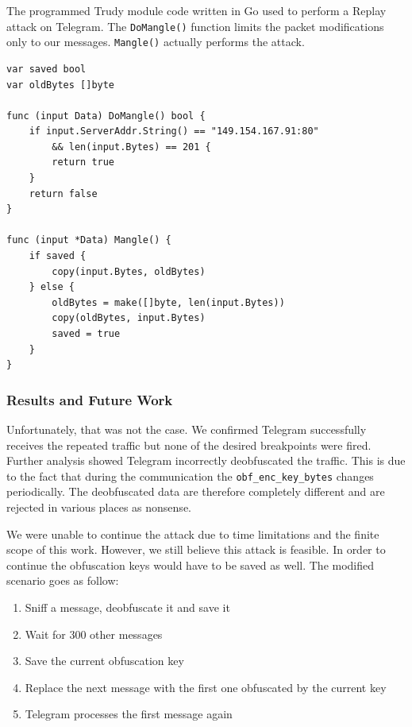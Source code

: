 \documentclass[thesis=M,english]{FITthesis}[2012/10/20]
\begin{document}
\begin{listing}[htb]
\caption{The programmed Trudy module code written in Go used to perform a Replay attack on Telegram. The \texttt{DoMangle()} function limits the packet modifications only to our messages. \texttt{Mangle()} actually performs the attack.}
\label{lst:analysis-replay-module}
\begin{verbatim}
var saved bool
var oldBytes []byte

func (input Data) DoMangle() bool {
	if input.ServerAddr.String() == "149.154.167.91:80"
		&& len(input.Bytes) == 201 {
		return true
	}
	return false
}

func (input *Data) Mangle() {
	if saved {
		copy(input.Bytes, oldBytes)
	} else {
		oldBytes = make([]byte, len(input.Bytes))
		copy(oldBytes, input.Bytes)
		saved = true
	}
}
\end{verbatim}
\end{listing}


\subsubsection{Results and Future Work}

Unfortunately, that was not the case. We confirmed Telegram successfully  receives the repeated traffic but none of the desired breakpoints were fired. Further analysis showed Telegram incorrectly deobfuscated the traffic. This is due to the fact that during the communication the \texttt{obf\_enc\_key\_bytes} changes periodically. The deobfuscated data are therefore completely different and are rejected in various places as nonsense.

We were unable to continue the attack due to time limitations and the finite scope of this work. However, we still believe this attack is feasible. In order to continue the obfuscation keys would have to be saved as well. The modified scenario goes as follow:

\begin{enumerate}
	\item Sniff a message, deobfuscate it and save it
	\item Wait for 300 other messages
	\item Save the current obfuscation key
	\item Replace the next message with the first one obfuscated by the current key
	\item Telegram processes the first message again
\end{enumerate}
\end{document}
